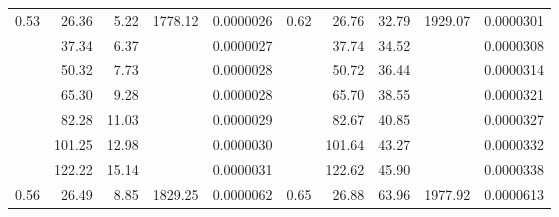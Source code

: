 \documentclass[UTF8,a4paper]{article}%
\begin{document}
\begin{table}[H]
\begin{tabular}{|r|r|r|r|r||r|r|r|r|r|}
        \multirow{7}{*}{0.53} & 26.36               & 5.22                             & \multirow{7}{*}{1778.12} & 0.0000026                    & \multirow{7}{*}{0.62} & 26.76               & 32.79                            & \multirow{7}{*}{1929.07} & 0.0000301                    \\
                              & 37.34               & 6.37                             &                          & 0.0000027                    &                       & 37.74               & 34.52                            &                          & 0.0000308                    \\
                              & 50.32               & 7.73                             &                          & 0.0000028                    &                       & 50.72               & 36.44                            &                          & 0.0000314                    \\
                              & 65.30               & 9.28                             &                          & 0.0000028                    &                       & 65.70               & 38.55                            &                          & 0.0000321                    \\
                              & 82.28               & 11.03                            &                          & 0.0000029                    &                       & 82.67               & 40.85                            &                          & 0.0000327                    \\
                              & 101.25              & 12.98                            &                          & 0.0000030                    &                       & 101.64              & 43.27                            &                          & 0.0000332                    \\
                              & 122.22              & 15.14                            &                          & 0.0000031                    &                       & 122.62              & 45.90                            &                          & 0.0000338                    \\ \hline
        \multirow{7}{*}{0.56} & 26.49               & 8.85                             & \multirow{7}{*}{1829.25} & 0.0000062                    & \multirow{7}{*}{0.65} & 26.88               & 63.96                            & \multirow{7}{*}{1977.92} & 0.0000613                    \\

\end{tabular}
\end{table}
\end{document}
